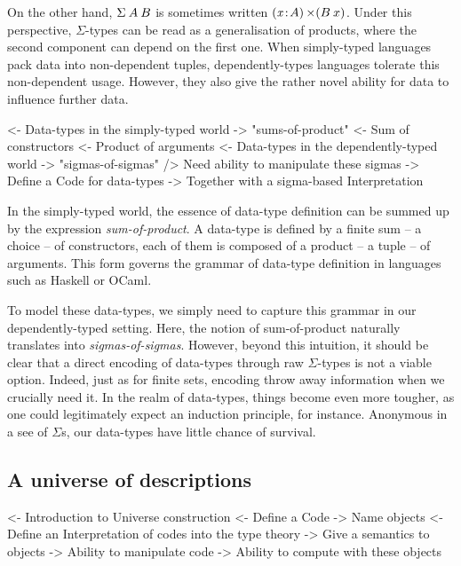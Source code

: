 On the other hand, $\SigmaTy{A}{B}$ is sometimes written
$\SIGMA{\V{x}}{A} (B\: x)$. Under this perspective, $\Sigma$-types can
be read as a generalisation of products, where the second component
can depend on the first one. When simply-typed languages pack data
into non-dependent tuples, dependently-types languages tolerate this
non-dependent usage. However, they also give the rather novel ability
for data to influence further data.

\begin{wstructure}
<- Data-types in the simply-typed world
    -> "sums-of-product"
        <- Sum of constructors
        <- Product of arguments
<- Data-types in the dependently-typed world
    -> "sigmas-of-sigmas"
    /> Need ability to manipulate these sigmas
        -> Define a Code for data-types
        -> Together with a sigma-based Interpretation
\end{wstructure}

In the simply-typed world, the essence of data-type definition can be
summed up by the expression \emph{sum-of-product}. A data-type is defined
by a finite sum -- a choice -- of constructors, each of them is
composed of a product -- a tuple -- of arguments. This form governs
the grammar of data-type definition in languages such as Haskell or
OCaml.

To model these data-types, we simply need to capture this grammar in
our dependently-typed setting. Here, the notion of sum-of-product
naturally translates into \emph{sigmas-of-sigmas}. However, beyond
this intuition, it should be clear that a direct encoding of
data-types through raw $\Sigma$-types is not a viable option. Indeed,
just as for finite sets, encoding throw away information when we
crucially need it. In the realm of data-types, things become even more
tougher, as one could legitimately expect an induction principle, for
instance. Anonymous in a see of $\Sigma$s, our data-types have little
chance of survival. 


\subsection{A universe of descriptions}
\label{sec:desc-universe}

\begin{wstructure}
<- Introduction to Universe construction
    <- Define a Code
        -> Name objects
    <- Define an Interpretation of codes into the type theory
        -> Give a semantics to objects
    -> Ability to manipulate code
    -> Ability to compute with these objects
\end{wstructure}

